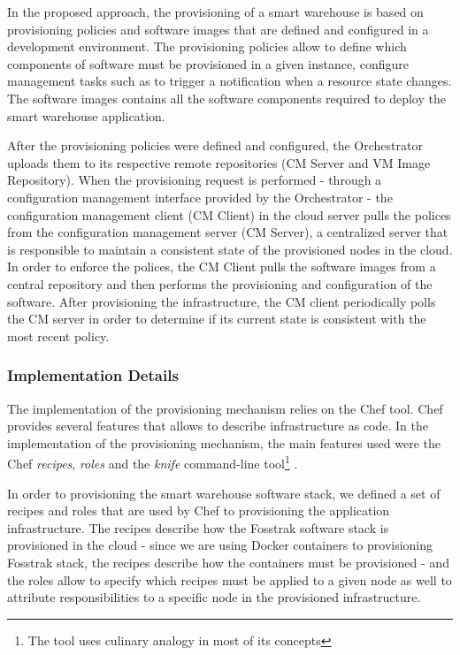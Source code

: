 In the proposed approach, the provisioning of a smart warehouse is based on provisioning policies and
software images that are defined and configured in a development environment. The provisioning policies
allow to define which components of software must be provisioned in a given instance, configure
management tasks such as to trigger a notification when a resource state changes. The software images
contains all the software components required to deploy the smart warehouse application.

After the provisioning policies were defined and configured, the Orchestrator uploads them to its respective
remote repositories (CM Server and VM Image Repository). When the provisioning request is performed -
through a configuration management interface provided by the Orchestrator - the configuration management
client (\gls{CM} Client) in the cloud server pulls the polices from the configuration management server
(\gls{CM} Server), a centralized server that is responsible to maintain a consistent state of the
provisioned nodes in the cloud. In order to enforce the polices, the \gls{CM} Client pulls the software
images from a central repository and then performs the provisioning and configuration of the software.
After provisioning the infrastructure, the CM client periodically polls the CM server in order to
determine if its current state is consistent with the most recent policy.

\subsubsection{Implementation Details}
\label{subs:impl_provisioning}
The implementation of the provisioning mechanism relies on the Chef tool. Chef provides several
features that allows to describe infrastructure as code. In the implementation of the provisioning
mechanism, the main features used were the Chef \textit{recipes}, \textit{roles} and the \textit{knife}
command-line tool\footnote{The tool uses culinary analogy in most of its concepts} .

In order to provisioning the smart warehouse software stack, we defined a set of recipes and roles that
are used by Chef to provisioning the application infrastructure. The recipes describe how the
Fosstrak software stack is provisioned in the cloud - since we are using Docker containers to
provisioning Fosstrak stack, the recipes describe how the containers must be provisioned -
and the roles allow to specify which recipes must be applied to a given node as well to
attribute responsibilities to a specific node in the provisioned infrastructure.


